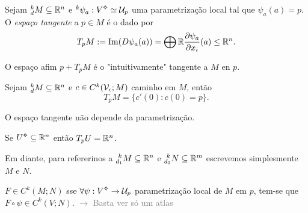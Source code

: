 \begin{definition}
    Sejam \(^k_dM\subseteq \mathbb{R}^n\) e \(^k \psi_a: V\ab \simeq \U_p\) uma parametrização local tal que \(\psi_a(a)=p\). O \emph{espaço tangente} a \(p \in M \) é o dado por 
    \[T_pM := \operatorname{Im}(D\psi_a(a))= \bigoplus \mathbb{R} \frac{\partial \psi_a}{\partial x_i} (a)\leq \mathbb{R}^n. \]
\end{definition}

\begin{note}
    O espaço afim \(p + T_pM\) é o "intuitivamente" tangente a \(M\) en \(p\).
\end{note}

\begin{proposition}
    Sejam \(^k_d M \subseteq \mathbb{R}^n\) e \(c \in C^k(\mathcal{V}_\epsilon ; M)\) caminho em \(M\), então 
    \[T_pM = \{c'(0): c(0) =p \}. \] 
\end{proposition}

\begin{note}
    O espaço tangente não depende da parametrização.
\end{note}

\begin{example}
    Se \(U\ab\subseteq \R^n\) então \(T_pU= \mathbb{R}^n\). 
\end{example}


\begin{note}
    Em diante, para refererinos a \(^{\hspace{0.1cm}k}_{d_1}M\subseteq \mathbb{R}^n\) e \(^{\hspace{0.1cm}k}_{d_2}N\subseteq \mathbb{R}^m\) escrevemos simplesmente \(M\) e \(N\). %
\end{note}

\begin{proposition}
    \(F\in C^k(M;N)\) sse \(\forall \psi: V\ab \to \U_p\) parametrização local de \(M\) em \(p\), tem-se que \(F \circ \psi \in C^k(V; N)\). \textcolor{gray}{\(\rightarrow\) Basta ver só um  atlas}  
\end{proposition}

